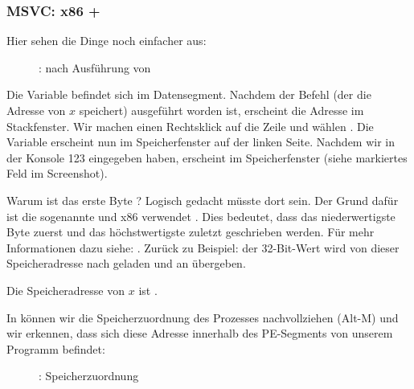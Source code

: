 \clearpage
\subsubsection{MSVC: x86 + \olly}
\myindex{\olly}

Hier sehen die Dinge noch einfacher aus:

\begin{figure}[H]
\centering
{}
\caption{\olly: nach Ausführung von \scanf}
\label{fig:scanf_ex2_olly_1}
\end{figure}

Die Variable befindet sich im Datensegment.
Nachdem der \PUSH Befehl (der die Adresse von $x$ speichert) ausgeführt worden ist,
erscheint die Adresse im Stackfenster. Wir machen einen Rechtsklick auf die Zeile und wählen .
Die Variable erscheint nun im Speicherfenster auf der linken Seite. 
Nachdem wir in der Konsole 123 eingegeben haben, erscheint  im Speicherfenster (siehe markiertes Feld im
Screenshot).

Warum ist das erste Byte ?
Logisch gedacht müsste dort  sein. 
Der Grund dafür ist die sogenannte  und x86 verwendet . 
Dies bedeutet, dass das niederwertigste Byte zuerst und das höchstwertigste zuletzt geschrieben werden.
Für mehr Informationen dazu siehe: .
Zurück zu Beispiel: der 32-Bit-Wert wird von dieser Speicheradresse nach \EAX geladen und an \printf übergeben. 

Die Speicheradresse von $x$ ist .

\clearpage
In \olly können wir die Speicherzuordnung des Prozesses nachvollziehen (Alt-M) und wir erkennen, dass sich diese Adresse
innerhalb des  PE-Segments von unserem Programm befindet:

\label{olly_memory_map_example}
\begin{figure}[H]
\centering
{}
\caption{\olly: Speicherzuordnung}
\label{fig:scanf_ex2_olly_2}
\end{figure}

